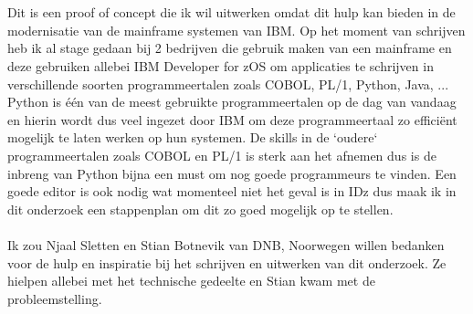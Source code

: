 
\chapter*{}%
\label{ch:voorwoord}


Dit is een proof of concept die ik wil uitwerken omdat dit hulp kan bieden in de modernisatie van de mainframe systemen van IBM. Op het moment van schrijven heb ik al stage gedaan bij 2 bedrijven die gebruik maken van een mainframe en deze gebruiken allebei IBM Developer for zOS om applicaties te schrijven in verschillende soorten programmeertalen zoals COBOL, PL/1, Python, Java, ... Python is één van de meest gebruikte programmeertalen op de dag van vandaag en hierin wordt dus veel ingezet door IBM om deze programmeertaal zo efficiënt mogelijk te laten werken op hun systemen. De skills in de `oudere` programmeertalen zoals COBOL en PL/1 is sterk aan het afnemen dus is de inbreng van Python bijna een must om nog goede programmeurs te vinden. Een goede editor is ook nodig wat momenteel niet het geval is in IDz dus maak ik in dit onderzoek een stappenplan om dit zo goed mogelijk op te stellen.
\\ \\
Ik zou Njaal Sletten en Stian Botnevik van DNB, Noorwegen willen bedanken voor de hulp en inspiratie bij het schrijven en uitwerken van dit onderzoek. Ze hielpen allebei met het technische gedeelte en Stian kwam met de probleemstelling.